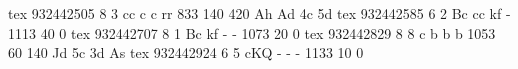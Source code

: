 tex       932442505  8  3 cc  c     c     rr         833  140  420 Ah Ad 4c 5d
tex       932442585  6  2 Bc  cc    kf    -         1113   40    0 
tex       932442707  8  1 Bc  kf    -     -         1073   20    0 
tex       932442829  8  8 c   b     b     b         1053   60  140 Jd 5c 3d As
tex       932442924  6  5 cKQ -     -     -         1133   10    0 
